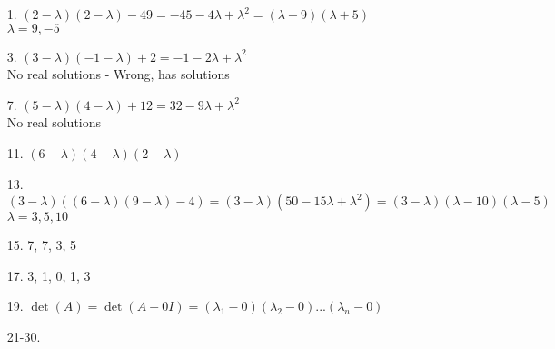 \documentclass[leqno]{article}
\begin{document}
\begin{enumerate}
    \item[1.] $(2 - \lambda)(2 - \lambda) - 49 = -45 - 4\lambda + \lambda^2 = (\lambda - 9)(\lambda + 5)$\\
    $\lambda = 9, -5$
    \item[3.] $(3 - \lambda)(-1 - \lambda) + 2 = -1 - 2\lambda + \lambda^2$\\
    No real solutions - Wrong, has solutions
    \item[7.] $(5 - \lambda)(4 - \lambda) + 12 = 32 - 9\lambda + \lambda^2$\\
    No real solutions
    \item[11.] $(6 - \lambda)(4 - \lambda)(2 - \lambda)$
    \item[13.] $(3 - \lambda)((6 - \lambda)(9 - \lambda) - 4) = (3 - \lambda)(50 -15\lambda + \lambda^2) = (3 - \lambda)(\lambda - 10)(\lambda - 5)$\\
    $\lambda = 3, 5, 10$
    \item[15.] 7, 7, 3, 5
    \item[17.] 3, 1, 0, 1, 3
    \item[19.] $\det(A) = \det(A - 0I) = (\lambda_1 - 0)(\lambda_2 - 0)...(\lambda_n - 0)$
    \item[21-30.]
\end{enumerate}
\end{document}
